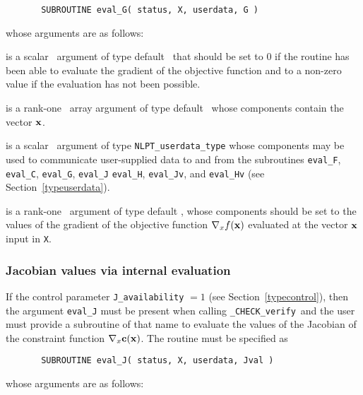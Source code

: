 \documentclass{galahad}
\newcommand{\packagename}{CHECK}
\newcommand{\fullpackagename}{\libraryname\_\packagename}
\newcommand{\solver}{{\tt \fullpackagename\_verify}}
\begin{document}
\def\baselinestretch{0.8}
{\tt \begin{verbatim}
       SUBROUTINE eval_G( status, X, userdata, G ) \end{verbatim} }
\def\baselinestretch{1.0}
\noindent whose arguments are as follows:

\begin{description}
 is a scalar \intentout\ argument of type default \integer\
that should be set to 0 if the routine has been able to evaluate
the gradient of the objective function
and to a non-zero value if the evaluation has not been possible.

 is a rank-one \intentin\ array argument of type default \realdp\
whose components contain the vector ${\mathbf{x}}$.

 is a scalar \intentinout\ argument of type 
{\tt NLPT\_userdata\_type} whose components may be used
to communicate user-supplied data to and from the
subroutines {\tt eval\_F}, {\tt eval\_C}, {\tt eval\_G}, {\tt eval\_J}
{\tt eval\_H}, {\tt eval\_Jv}, and {\tt eval\_Hv} 
(see Section~\ref{typeuserdata}).

 is a rank-one \intentout\ argument of type default \realdp,
whose components should be set to the values of the gradient 
of the objective function $\nabla_x f({\mathbf{x}})$
evaluated at the vector ${\mathbf{x}}$ input in {\tt X}.

\end{description}


\subsubsection{Jacobian values via internal evaluation\label{jfv}}

If the control parameter {\tt J\_availability} $=1$ (see
Section~\ref{typecontrol}), then the argument {\tt eval\_J} must be
present when calling \solver\ and the
user must provide a subroutine of that name to evaluate the
values of the Jacobian of the constraint function $\nabla_x {\mathbf{c}}({\mathbf{x}})$.
The routine must be specified as

\def\baselinestretch{0.8}
{\tt \begin{verbatim}
       SUBROUTINE eval_J( status, X, userdata, Jval ) \end{verbatim} }
\def\baselinestretch{1.0}
\noindent whose arguments are as follows:
\end{document}
